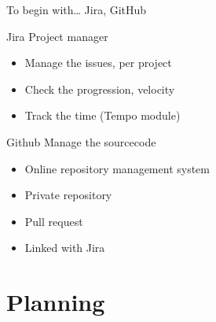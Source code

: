 \documentclass[10pt,a4paper]{beamer}
\begin{document}
\begin{frame}{To begin with… Jira, GitHub}

  \begin{block}{Jira}
  	Project manager
    \begin{itemize}
      \item Manage the issues, per project
      \item Check the progression, velocity
      \item Track the time (Tempo module)
    \end{itemize}
  \end{block}

  \begin{block}{Github}
  	Manage the sourcecode
    \begin{itemize}
      \item Online repository management system
      \item Private repository
      \item Pull request
      \item Linked with Jira
    \end{itemize}
  \end{block}
\end{frame}

\section{Planning}
\end{document}
